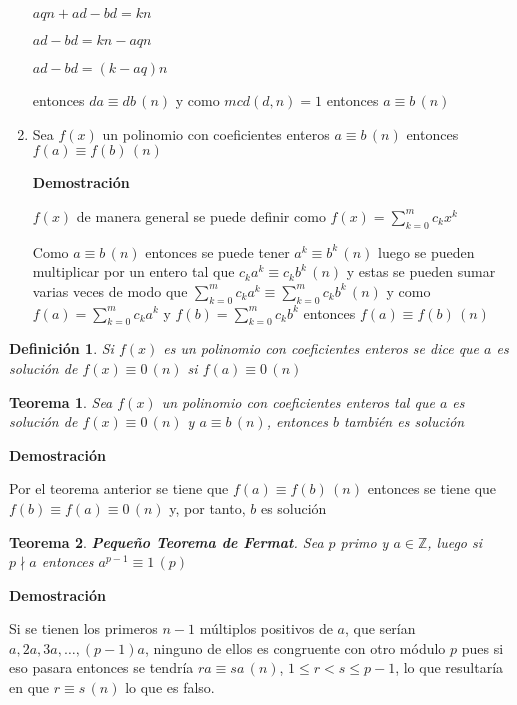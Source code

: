 \documentclass[a4paper,12pt]{report}
\newtheorem*{teo}{Teorema}
\newtheorem*{dfn}{Definición}
\begin{document}
\begin{enumerate}
 $aqn+ad-bd=kn$
 
 $ad-bd=kn-aqn$
 
 $ad-bd=(k-aq)n$
 
 entonces $da\equiv db \, (n)$ y como $mcd(d,n)=1$ entonces $a\equiv b\, (n)$
 
 \item Sea $f(x)$ un polinomio con coeficientes enteros $a \equiv b \, (n)$ entonces 
 $f(a) \equiv f(b) \, (n)$
 
  \textbf{Demostración}
  
  $f(x)$ de manera general se puede definir como $f(x)=\sum^{m}_{k=0}c_kx^k$
  
  Como $a \equiv b \, (n)$ entonces se puede tener $a^k \equiv b^k \, (n)$ luego se pueden multiplicar por un entero tal que $c_ka^k \equiv c_kb^k \, (n)$ y estas se pueden sumar varias veces de modo que $\sum^{m}_{k=0}c_ka^k \equiv \sum^{m}_{k=0}c_kb^k \, (n)$ y como $f(a)=\sum^{m}_{k=0}c_ka^k$ y $f(b)=\sum^{m}_{k=0}c_kb^k$ entonces $f(a)\equiv f(b) \, (n)$
  
  
\end{enumerate}

\begin{dfn}
 Si $f(x)$ es un polinomio con coeficientes enteros se dice que $a$ es solución de $f(x)\equiv 0 \, (n)$ si $f(a)\equiv 0 \, (n)$
\end{dfn}


\begin{teo}
 Sea $f(x)$ un polinomio con coeficientes enteros tal que $a$ es solución de  $f(x)\equiv 0 \, (n)$  y $a \equiv b \, (n)$, entonces $b$ también es solución
\end{teo}

\textbf{Demostración}

Por el teorema anterior se tiene que $f(a)\equiv f(b) \, (n)$ entonces se tiene que $f(b)\equiv f(a) \equiv 0\, (n)$ y, por tanto, $b$ es solución




\begin{teo}
 \textbf{Pequeño Teorema de Fermat}. Sea $p$ primo y $a\in\mathbb{Z}$, luego si $p\nmid a$ entonces $a^{p-1} \equiv 1 \, (p)$
\end{teo}

\textbf{Demostración}

Si se tienen los primeros $n-1$ múltiplos positivos de $a$, que serían $a,2a,3a,\dots,(p-1)a$, ninguno de ellos es congruente con otro módulo $p$ pues si eso pasara entonces se tendría $ra\equiv sa \, (n)$, $1\leq r < s \leq p-1$, lo que resultaría en que $r\equiv s \, (n)$ lo que es falso.
\end{document}
